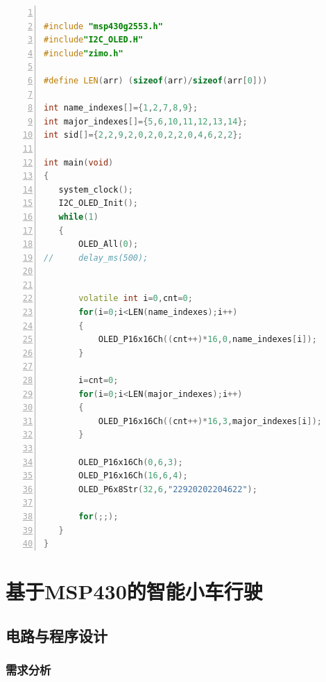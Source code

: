 \documentclass[a4paper,twoside,zihao=5,UTF8]{ctexart}
\begin{document}
\begin{spacing}{1.2}
\begin{lstlisting}[language=c++,numbers=left,style=CppStyle,caption=作业6,label={code:p6}]

#include "msp430g2553.h"
#include"I2C_OLED.H"
#include"zimo.h"

#define LEN(arr) (sizeof(arr)/sizeof(arr[0]))

int name_indexes[]={1,2,7,8,9};
int major_indexes[]={5,6,10,11,12,13,14};
int sid[]={2,2,9,2,0,2,0,2,2,0,4,6,2,2};

int main(void)
{
   system_clock();
   I2C_OLED_Init();
   while(1)
   {
	   OLED_All(0);
//	   delay_ms(500);


	   volatile int i=0,cnt=0;
	   for(i=0;i<LEN(name_indexes);i++)
	   {
	       OLED_P16x16Ch((cnt++)*16,0,name_indexes[i]);
	   }

	   i=cnt=0;
	   for(i=0;i<LEN(major_indexes);i++)
	   {
	       OLED_P16x16Ch((cnt++)*16,3,major_indexes[i]);
	   }

	   OLED_P16x16Ch(0,6,3);
	   OLED_P16x16Ch(16,6,4);
	   OLED_P6x8Str(32,6,"22920202204622");

	   for(;;);
   }
}
\end{lstlisting}


\section{基于MSP430的智能小车行驶}

\subsection{电路与程序设计}

\subsubsection{需求分析}


\end{spacing}
\end{document}
